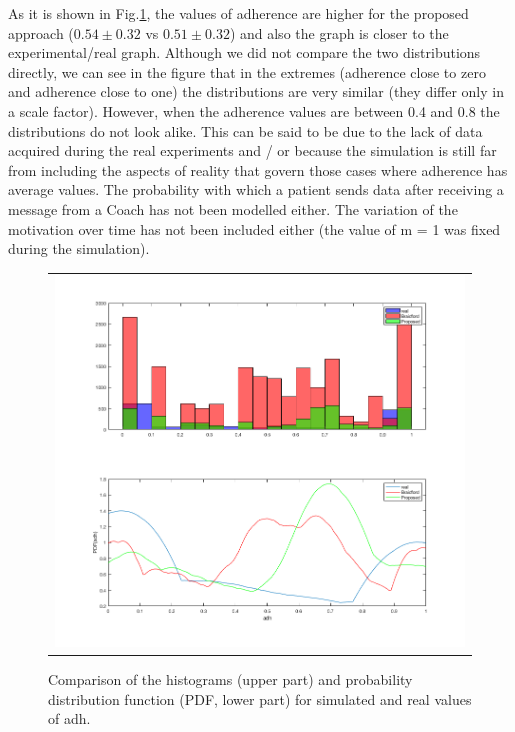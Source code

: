 \documentclass[graybox]{svmult}
\begin{document}
As it is shown in Fig.\ref{Fig.REALvsSIM}, the values of adherence are higher for the proposed approach ($0.54\pm0.32$ vs $0.51\pm0.32$) and also the graph is closer to the experimental/real graph. Although we did not compare the two distributions directly, we can see in the figure that in the extremes (adherence close to zero and adherence close to one) the distributions are very similar (they differ only in a scale factor). However, when the adherence values are between 0.4 and 0.8 the distributions do not look alike. This can be said to be due to the lack of data acquired during the real experiments and / or because the simulation is still far from including the aspects of reality that govern those cases where adherence has average values. The probability with which a patient sends data after receiving a message from a Coach has not been modelled either. The variation of the motivation over time has not been included either (the value of m = 1 was fixed during the simulation).
\begin{figure}
  \begin{center}
  \begin{tabular}{c}
    \includegraphics[scale=0.4]{REALvsBRAIDFORDvsPROPOSED.png}\\
    \end{tabular}
    \caption{Comparison of the histograms (upper part) and probability distribution function (PDF, lower part) for simulated and real values of adh.}
     \label{Fig.REALvsSIM}
\end{center}
\end{figure} 
\end{document}
